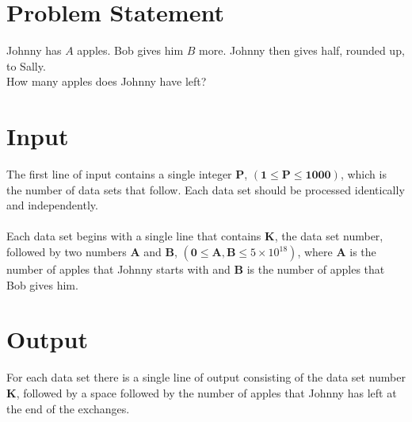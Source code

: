 \documentclass[a4paper,11pt,oneside]{article}
\begin{document}
\pagestyle{fancy}



\section{Problem Statement}
Johnny has $A$ apples. Bob gives him $B$ more. Johnny then gives half, rounded up, to Sally.\\
How many apples does Johnny have left?

\section{Input}
The first line of input contains a single integer $\boldsymbol{P}$,
$(\boldsymbol{1} \le \boldsymbol{P} \le \boldsymbol{1000})$, which is the
number of data sets that follow. Each data set should be processed identically
and independently.
\\\\
Each data set begins with a single line that contains $\boldsymbol{K}$, the data
set number, followed by two numbers $\boldsymbol{A}$ and $\boldsymbol{B}$,
$(\boldsymbol{0} \le \boldsymbol{A}, \boldsymbol{B} \le 5 \times 10^{18})$, where
$\boldsymbol{A}$ is the number of apples that Johnny starts with and $\boldsymbol{B}$ is
the number of apples that Bob gives him.


\section{Output}
For each data set there is a single line of output consisting of the data set number $\boldsymbol{K}$,
followed by a space followed by the number of apples that Johnny has left at the end of the exchanges.
\end{document}
